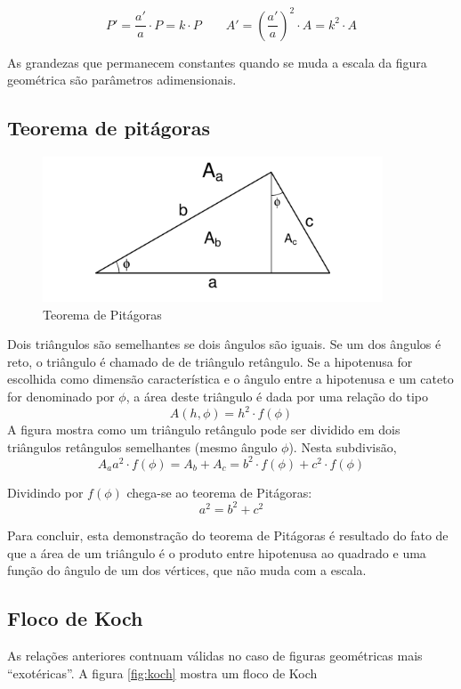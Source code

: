 \documentclass[article,12pt,oneside,a4paper,english,brazil,sumario=tradicional]{abntex2}
\begin{document}
\[
P' = \frac{a'}{a}\cdot P = k\cdot P \qquad A' = \left(\frac{a'}{a}\right)^2\cdot A = k^2\cdot A
\]

As grandezas que permanecem constantes quando se muda a escala da figura geométrica são parâmetros adimensionais.

\subsection{Teorema de pitágoras}

\begin{figure}
  \centering
  \includegraphics[width=0.9\textwidth]{./figuras/pitagoras}
  \caption{Teorema de Pitágoras}
  \label{fig:pit}
\end{figure}

Dois triângulos são semelhantes se dois ângulos são iguais. Se um dos ângulos é reto, o triângulo é chamado de de triângulo retângulo. Se a hipotenusa for escolhida como dimensão característica e o ângulo entre a hipotenusa e um cateto for denominado por $\phi$, a área deste triângulo é dada por uma relação do tipo
\[
A(h,\phi) = h^2\cdot f(\phi)
\]
A figura mostra como um triângulo retângulo pode ser dividido em dois triângulos retângulos semelhantes (mesmo ângulo $\phi$). Nesta subdivisão, 
\[
A_a a^2\cdot f(\phi) = A_b + A_c = b^2\cdot f(\phi) + c^2\cdot f(\phi)
\]

Dividindo por $f(\phi)$ chega-se ao teorema de Pitágoras:
\[
a^2 = b^2 + c^2
\]

Para concluir, esta demonstração do teorema de Pitágoras é resultado do fato de que a área de um triângulo é o produto entre hipotenusa ao quadrado e uma função do ângulo de um dos vértices, que não muda com a escala.


\subsection{Floco de Koch}

As relações anteriores contnuam válidas no caso de figuras geométricas mais ``exotéricas''. A figura \ref{fig:koch} mostra um floco de Koch
\end{document}
